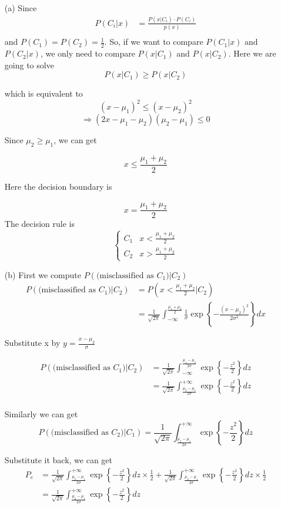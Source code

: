 \documentclass[a4paper,12pt]{article}
\begin{document}
\begin{itemize}
\item[(a)]
Since
\begin{align*}
P(C_i|x) &= \frac{P(x|C_i) \cdot P(C_i)}{p(x)}\\
\end{align*}
and $P(C_1) = P(C_2) = \frac{1}{2}$. So, if we want to compare $P(C_1|x)$ and $P(C_2|x)$, we only need to compare $P(x|C_1)$ and $P(x|C_2)$. Here we are going to solve
$$
P(x|C_1) \ge P(x|C_2)
$$

which is equivalent to
$$(x - \mu_1)^2 \le (x - \mu_2)^2$$
$$\Rightarrow (2x - \mu_1 - \mu_2) (\mu_2 - \mu_1) \le 0$$

Since $\mu_2 \ge \mu_1$, we can get

$$x \le \frac{\mu_1 + \mu_2}{2}$$

Here the decision boundary is 

$$x = \frac{\mu_1 + \mu_2}{2}$$
The decision rule is 
$$\begin{cases}
C_1 & x < \frac{\mu_1 + \mu_2}{2} \\
C_2 & x > \frac{\mu_1 + \mu_2}{2} 
\end{cases}$$

\clearpage
\item[(b)]
First we compute $P\left (\text{(misclassified as $C_1$)} | C_2 \right) $
\begin{align*}
P\left (\text{(misclassified as $C_1$)} | C_2 \right) 
&= P (x < \frac{\mu_1 + \mu_2}{2} | C_2)  \\
&= \frac{1}{\sqrt{2 \pi}}\int_{-\infty}^{\frac{\mu_1+\mu_2}{2}} \frac{1}{\sigma} \exp \left \{ -\frac{(x - \mu_2)^2}{2 \sigma^2}\right \} dx
\end{align*}

Substitute x by $y = \frac{x - \mu_2}{\sigma}$

\begin{align*}
P\left (\text{(misclassified as $C_1$)} | C_2 \right) 
&=  \frac{1}{\sqrt{2 \pi}}\int_{-\infty}^{\frac{\mu_1 - \mu_2}{2 \sigma}} \exp \left \{ -\frac{z^2}{2}\right \} dz \\
&= \frac{1}{\sqrt{2 \pi}}\int^{+\infty}_{\frac{\mu_2 - \mu_1}{2 \sigma}} \exp \left \{ -\frac{z^2}{2}\right \} dz \\
\end{align*}

Similarly we can get
$$
P\left (\text{(misclassified as $C_2$)} | C_1 \right) =  \frac{1}{\sqrt{2 \pi}}\int^{+\infty}_{\frac{\mu_2 - \mu_1}{2 \sigma}} \exp \left \{ -\frac{z^2}{2}\right \} dz
$$

Substitute it back, we can get
\begin{align*}
P_e 
&= \frac{1}{\sqrt{2 \pi}}\int^{+\infty}_{\frac{\mu_2 - \mu_1}{2 \sigma}} \exp \left \{ -\frac{z^2}{2}\right \} dz \times \frac{1}{2} + \frac{1}{\sqrt{2 \pi}}\int^{+\infty}_{\frac{\mu_2 - \mu_1}{2 \sigma}} \exp \left \{ -\frac{z^2}{2}\right \} dz \times \frac{1}{2}\\
&=\frac{1}{\sqrt{2 \pi}}\int^{+\infty}_{\frac{\mu_2 - \mu_1}{2 \sigma}} \exp \left \{ -\frac{z^2}{2}\right \} dz 
\end{align*}
\end{itemize}
\end{document}
